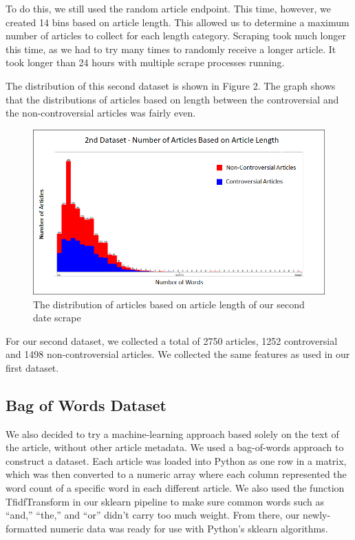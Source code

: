 \documentclass{article}
\begin{document}
To do this, we still used the random article endpoint. This time, however, we created 14 bins based on article length. This allowed us to determine a maximum number of articles to collect for each length category. Scraping took much longer this time, as we had to try many times to randomly receive a longer article. It took longer than 24 hours with multiple scrape processes running.

The distribution of this second dataset is shown in Figure 2. The graph shows that the distributions of articles based on length between the controversial and the non-controversial articles was fairly even.


\begin{figure}[t]
	\centering
	\includegraphics[width=\columnwidth]{images/second-scrape.png}
	\caption{ The distribution of articles based on article length of our second date scrape}
	\label{fig:second-scrape}
\end{figure}

For our second dataset, we collected a total of 2750 articles, 1252 controversial and 1498 non-controversial articles. We collected the same features as used in our first dataset.

\subsection{Bag of Words Dataset}

We also decided to try a machine-learning approach based solely on the text of the article, without other article metadata. We used a bag-of-words approach to construct a dataset. Each article was loaded into Python as one row in a matrix, which was then converted to a numeric array where each column represented the word count of a specific word in each different article. We also used the function TfidfTransform in our sklearn pipeline to make sure common words such as “and,” “the,” and “or” didn’t carry too much weight. From there, our newly-formatted numeric data was ready for use with Python’s sklearn algorithms.
\end{document}
